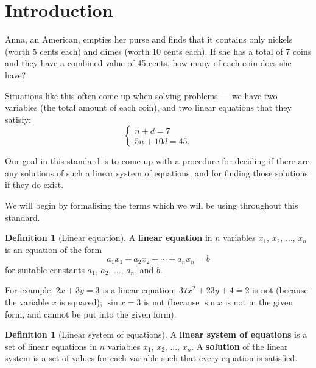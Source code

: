 \documentclass[a4paper,leqno]{article}
\numberwithin{equation}{section}
\theoremstyle{definition}
\newtheorem{defn}[equation]{Definition}
\theoremstyle{remark}
\newcommand{\df}[1]{\textbf{#1}}
\begin{document}
\section{Introduction}
\begin{center}
  \itshape\parbox{0.8\textwidth}{
    Anna, an American, empties her purse and finds that it contains only nickels (worth 5 cents each) and dimes (worth 10 cents each). If she has a total
    of 7 coins and they have a combined value of 45 cents, how many of each coin does she have?
  }
\end{center}

Situations like this often come up when solving problems --- we have two variables (the total amount of each coin), and two linear equations that
they satisfy:
\begin{equation}
  \begin{cases}
    n + d = 7\\
    5n + 10d = 45.
  \end{cases}
\end{equation}

Our goal in this standard is to come up with a procedure for deciding if there are any solutions of such a linear system of equations, and for finding
those solutions if they do exist.

We will begin by formalising the terms which we will be using throughout this standard.

\begin{defn}[Linear equation]
  A \df{linear equation} in $ n $ variables $ x_1 $, $ x_2 $, ..., $ x_n $ is an equation of the form
  \begin{displaymath}
    a_1 x_1 + a_2 x_2 + \cdots + a_n x_n = b
  \end{displaymath}
  for suitable constants $ a_1 $, $ a_2 $, ..., $ a_n $, and $ b $.
\end{defn}

For example, $ 2x + 3y = 3 $ is a linear equation; $ 37x^2 + 23y + 4 = 2 $ is not (because the variable $ x $ is squared); $ \sin x = 3 $ is
not (because $ \sin x $ is not in the given form, and cannot be put into the given form).

\begin{defn}[Linear system of equations]
  A \df{linear system of equations} is a set of linear equations in $ n $ variables $ x_1 $, $ x_2 $, ..., $ x_n $. A \df{solution} of the
  linear system is a set of values for each variable such that every equation is satisfied.
\end{defn}
\end{document}

